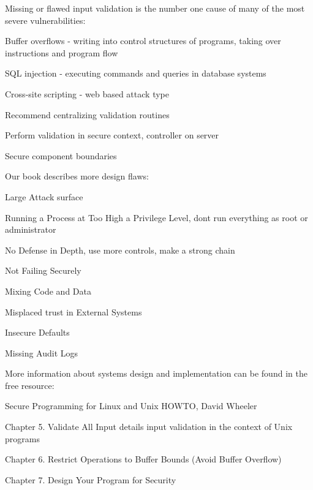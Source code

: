 \documentclass[Screen16to9,17pt]{foils}
\begin{document}

Missing or flawed input validation is the number one cause of many of the most severe vulnerabilities:
\begin{list2}
\item Buffer overflows - writing into control structures of programs, taking over instructions and program flow
\item SQL injection - executing commands and queries in database systems
\item Cross-site scripting - web based attack type
\item Recommend centralizing validation routines
\item Perform validation in secure context, controller on server
\item Secure component boundaries
\end{list2}


Our book describes more design flaws:
\begin{list2}
\item Large Attack surface
\item Running a Process at Too High a Privilege Level, dont run everything as root or administrator
\item No Defense in Depth, use more controls, make a strong chain
\item Not Failing Securely
\item Mixing Code and Data
\item Misplaced trust in External Systems
\item Insecure Defaults
\item Missing Audit Logs
\end{list2}


\begin{list1}
\item More information about systems design and implementation can be found in the free resource:
\item Secure Programming for Linux and Unix HOWTO, David Wheeler
\item {}
\item Chapter 5. Validate All Input details input validation in the context of Unix programs
\item Chapter 6. Restrict Operations to Buffer Bounds (Avoid Buffer Overflow)
\item Chapter 7. Design Your Program for Security
\end{list1}
\end{document}
